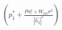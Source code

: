 \documentclass[preview]{standalone}
\begin{document}
\begin{align*}
\left(p_1^\ast + \frac{P \sigma_\epsilon^2 + W_{tot} \sigma^2}{\left|\hat{h_2}\right|^2}\right)
\end{align*}
\end{document}
